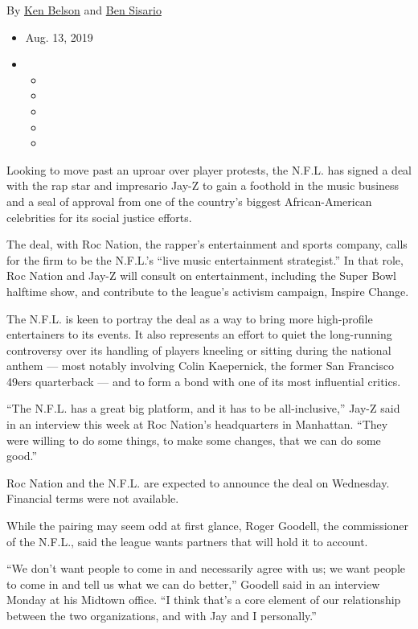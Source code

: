 By \href{https://www.nytimes3xbfgragh.onion/by/ken-belson}{Ken Belson}
and \href{https://www.nytimes3xbfgragh.onion/by/ben-sisario}{Ben
Sisario}

\begin{itemize}
\item
  Aug. 13, 2019
\item
  \begin{itemize}
  \item
  \item
  \item
  \item
  \item
  \end{itemize}
\end{itemize}

Looking to move past an uproar over player protests, the N.F.L. has
signed a deal with the rap star and impresario Jay-Z to gain a foothold
in the music business and a seal of approval from one of the country's
biggest African-American celebrities for its social justice efforts.

The deal, with Roc Nation, the rapper's entertainment and sports
company, calls for the firm to be the N.F.L.'s ``live music
entertainment strategist.'' In that role, Roc Nation and Jay-Z will
consult on entertainment, including the Super Bowl halftime show, and
contribute to the league's activism campaign, Inspire Change.

The N.F.L. is keen to portray the deal as a way to bring more
high-profile entertainers to its events. It also represents an effort to
quiet the long-running controversy over its handling of players kneeling
or sitting during the national anthem --- most notably involving Colin
Kaepernick, the former San Francisco 49ers quarterback --- and to form a
bond with one of its most influential critics.

``The N.F.L. has a great big platform, and it has to be all-inclusive,''
Jay-Z said in an interview this week at Roc Nation's headquarters in
Manhattan. ``They were willing to do some things, to make some changes,
that we can do some good.''

Roc Nation and the N.F.L. are expected to announce the deal on
Wednesday. Financial terms were not available.

While the pairing may seem odd at first glance, Roger Goodell, the
commissioner of the N.F.L., said the league wants partners that will
hold it to account.

``We don't want people to come in and necessarily agree with us; we want
people to come in and tell us what we can do better,'' Goodell said in
an interview Monday at his Midtown office. ``I think that's a core
element of our relationship between the two organizations, and with Jay
and I personally.''

